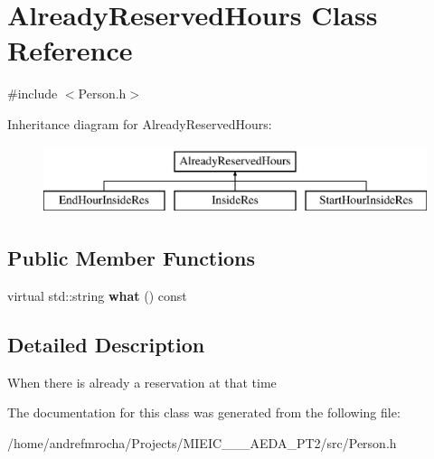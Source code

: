 \hypertarget{class_already_reserved_hours}{}\section{Already\+Reserved\+Hours Class Reference}
\label{class_already_reserved_hours}


{\ttfamily \#include $<$Person.\+h$>$}

Inheritance diagram for Already\+Reserved\+Hours\+:\begin{figure}[H]
\begin{center}
\leavevmode
\includegraphics[height=2.000000cm]{class_already_reserved_hours}
\end{center}
\end{figure}
\subsection*{Public Member Functions}
\begin{DoxyCompactItemize}
\item 
\mbox{\label{class_already_reserved_hours_a69081ef7e75aa68b9aa5c75d02fe2194}} 
virtual std\+::string {\bfseries what} () const
\end{DoxyCompactItemize}


\subsection{Detailed Description}
When there is already a reservation at that time 

The documentation for this class was generated from the following file\+:\begin{DoxyCompactItemize}
\item 
/home/andrefmrocha/\+Projects/\+M\+I\+E\+I\+C\+\_\+\_\+\_\+\+A\+E\+D\+A\+\_\+\+P\+T2/src/Person.\+h\end{DoxyCompactItemize}

